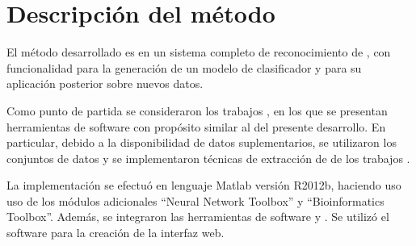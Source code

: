 %
%
%
%
\iflatexml{}\else\setcounter{chapter}{2}\fi%
%
\chapter{Descripción del método}
%
El método desarrollado es en un sistema completo de reconocimiento de
, con funcionalidad para la generación de un modelo de
clasificador y para su aplicación posterior sobre nuevos datos.

Como punto de partida se consideraron los trabajos
\cite{xue,ng,batuwita,sheng,sewer,ding}, en los que se presentan
herramientas de software con propósito similar al del presente
desarrollo.
En particular, debido a la disponibilidad de datos suplementarios,
se utilizaron los conjuntos de datos y se implementaron técnicas de
extracción de  de los trabajos \cite{xue,ng,batuwita}.

La implementación se efectuó en lenguaje Matlab versión R2012b,
haciendo uso uso de los módulos adicionales ``Neural Network Toolbox''
y ``Bioinformatics Toolbox''.
Además, se integraron las herramientas de software 
\cite{libsvm} y  \cite{vienna}.
Se utilizó el software \work\webdemo{} \cite{webdemobuilder} para
la creación de la interfaz web.

